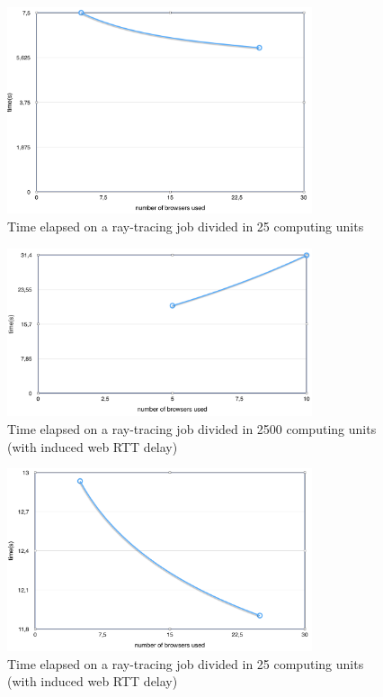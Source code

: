 \begin{figure}[]
  \centering
  \includegraphics[width=0.8\textwidth]{figs/2.png}
  \caption{Time elapsed on a ray-tracing job divided in 25 computing units}
  \label{fig:ray25}
\end{figure}

\begin{figure}[]
  \centering
  \includegraphics[width=0.8\textwidth]{figs/3.png}
  \caption{Time elapsed on a ray-tracing job divided in 2500 computing units (with induced web RTT delay)}
  \label{fig:ray2500time}
\end{figure}

\begin{figure}[]
  \centering
  \includegraphics[width=0.8\textwidth]{figs/4.png}
  \caption{Time elapsed on a ray-tracing job divided in 25 computing units (with induced web RTT delay)}
  \label{fig:ray25time}
\end{figure}

